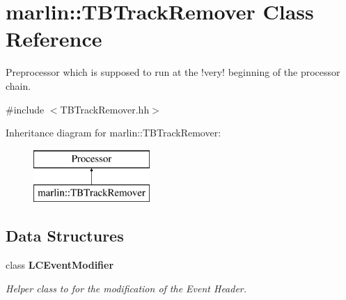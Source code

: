 \section{marlin\-:\-:T\-B\-Track\-Remover Class Reference}
\label{classmarlin_1_1TBTrackRemover}


Preprocessor which is supposed to run at the !very! beginning of the processor chain.  




{\ttfamily \#include $<$T\-B\-Track\-Remover.\-hh$>$}

Inheritance diagram for marlin\-:\-:T\-B\-Track\-Remover\-:\begin{figure}[H]
\begin{center}
\leavevmode
\includegraphics[height=2.000000cm]{classmarlin_1_1TBTrackRemover}
\end{center}
\end{figure}
\subsection*{Data Structures}
\begin{DoxyCompactItemize}
\item 
class {\bf L\-C\-Event\-Modifier}
\begin{DoxyCompactList}\small\item\em Helper class to for the modification of the Event Header. \end{DoxyCompactList}\end{DoxyCompactItemize}
